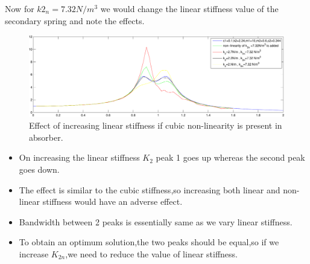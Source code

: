 Now for $k2_n=7.32 N/m^3$ we would change the linear stiffness value of the secondary spring and note the effects.
\begin{figure}[h!]
\includegraphics[width=\textwidth,height=0.5\textwidth]{"figures/nonlinearity_secondary_2"}
  \caption{Effect of increasing linear stiffness if cubic non-linearity is present in absorber.}
  \label{fig:non-linear secondary 2}
  \end{figure}
  \begin{itemize}
  \item On increasing the linear stiffness $K_2$ peak 1 goes up whereas the second peak goes down.
  \item The effect is similar to the cubic stiffness,so increasing both linear and non-linear stiffness would have an adverse effect.
  \item Bandwidth between 2 peaks is essentially same as we vary linear stiffness.
  \item To obtain an optimum solution,the two peaks should be equal,so if we increase $K_{2n}$,we need to reduce the value of linear stiffness.
  \end{itemize}
